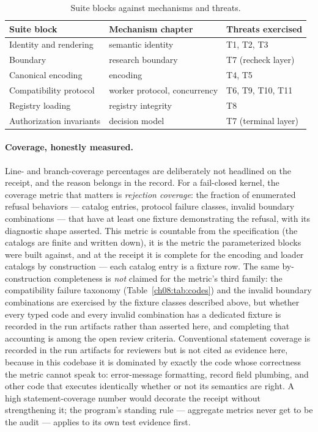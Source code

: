 \begin{table}[htbp]
\centering
\caption{Suite blocks against mechanisms and threats.}
\label{evid:tab:blocks}
\begin{tabular}{@{}lll@{}}
\toprule
Suite block & Mechanism chapter & Threats exercised \\
\midrule
Identity and rendering & semantic identity & T1, T2, T3 \\
Boundary & research boundary & T7 (recheck layer) \\
Canonical encoding & encoding & T4, T5 \\
Compatibility protocol & worker protocol, concurrency & T6, T9, T10, T11 \\
Registry loading & registry integrity & T8 \\
Authorization invariants & decision model & T7 (terminal layer) \\
\bottomrule
\end{tabular}
\end{table}

\paragraph{Coverage, honestly measured.} Line- and branch-coverage percentages are deliberately not headlined on the receipt, and the reason belongs in the record. For a fail-closed kernel, the coverage metric that matters is \emph{rejection coverage}: the fraction of enumerated refusal behaviors --- catalog entries, protocol failure classes, invalid boundary combinations --- that have at least one fixture demonstrating the refusal, with its diagnostic shape asserted. This metric is countable from the specification (the catalogs are finite and written down), it is the metric the parameterized blocks were built against, and at the receipt it is complete for the encoding and loader catalogs by construction --- each catalog entry is a fixture row. The same by-construction completeness is \emph{not} claimed for the metric's third family: the compatibility failure taxonomy (Table~\ref{ch08:tab:codes}) and the invalid boundary combinations are exercised by the fixture classes described above, but whether every typed code and every invalid combination has a dedicated fixture is recorded in the run artifacts rather than asserted here, and completing that accounting is among the open review criteria. Conventional statement coverage is recorded in the run artifacts for reviewers but is not cited as evidence here, because in this codebase it is dominated by exactly the code whose correctness the metric cannot speak to: error-message formatting, record field plumbing, and other code that executes identically whether or not its semantics are right. A high statement-coverage number would decorate the receipt without strengthening it; the program's standing rule --- aggregate metrics never get to be the audit --- applies to its own test evidence first.

